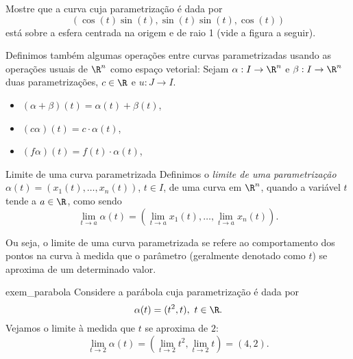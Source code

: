  \begin{exercise}{}{}
 Mostre que a curva cuja parametrização é dada por 
 $$\left(\cos(t)\sin(t), \sin(t)\sin(t), \cos(t)\right)
$$
 está sobre a esfera centrada na origem e de raio 1 (vide a figura a seguir). 
 
\begin{center}
\end{center}

 
 \end{exercise}

Definimos também algumas operações entre curvas  parametrizadas usando as operações usuais de $\R^n$ como espaço vetorial: Sejam $\alpha:I\to\R^n$ e $\beta:I\to\R^n$ duas parametrizações, $c\in\R$ e $u:J\to I$.
\begin{itemize}[label=\color{chapterscolor!110}\textbullet]
    \item $(\alpha+\beta)(t)=\alpha(t)+\beta(t)$,
    \item $(c\alpha)(t)=c\cdot \alpha(t)$,
    \item $(f\alpha)(t)=f(t)\cdot\alpha(t)$,
\end{itemize}




\begin{definition}{Limite de uma curva parametrizada}{}
Definimos o \textit{limite de uma parametrização} $\alpha(t)=(x_1(t),\dots,x_n(t))$, $t\in I$, de uma curva em $\R^n$, quando a variável $t$ tende a $a\in\R$, como sendo
$$\lim_{t\rightarrow a} \alpha(t)=\left(\lim_{t\rightarrow a} x_1(t),\dots,\lim_{t\rightarrow a} x_n(t)\right).$$
\end{definition}
 Ou seja, o limite de uma curva parametrizada se refere ao comportamento dos pontos na curva à medida que o parâmetro (geralmente denotado como $t$) se aproxima de um determinado valor. 

 \begin{example}{}{exem_parabola}
 Considere a parábola cuja parametrização é dada por
 $$\alpha(t)=(t^2,t),~t\in\R.$$
Vejamos o limite à medida que $t$ se aproxima de \(2\):
$$\lim_{t\rightarrow 2} \alpha(t) = \left(\lim_{t\rightarrow 2} t^2,\lim_{t\rightarrow 2} t\right)=(4,2).$$   
 \end{example}

